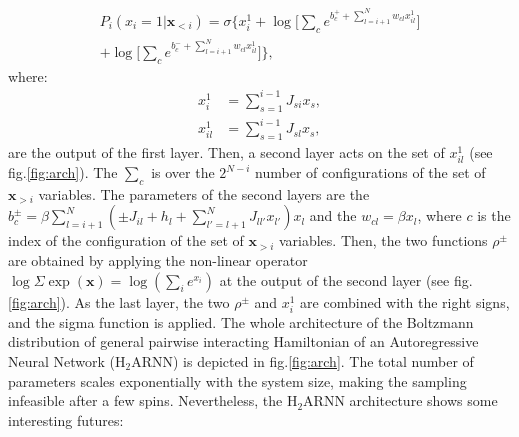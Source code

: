 \documentclass[aps,physrev,10pt,floatfix,reprint]{revtex4-2}
\begin{document}
\begin{multline}
    \label{eq:H2ANN}
        P_i\left(x_i=1 | \mathbf{x}_{<i}\right) = 
     \sigma \bigg\{ x_i^1 + \log\big[ \sum_{c} e^{b_c^+ + \sum_{l=i+1}^{N} w_{cl} x_{il}^1}\big]\\
     +\log\big[ \sum_{c} e^{b_c^- + \sum_{l=i+1}^{N} w_{cl} x_{il}^1}\big] \bigg\},
\end{multline}
where:
\begin{align}
    \label{eq:x_i_first}
    x_i^1 &= \sum_{s=1}^{i-1} J_{si} x_s,\\
    \label{eq:x_il_first}
    x_{il}^1 &= \sum_{s=1}^{i-1} J_{sl} x_s,
\end{align}
 are the output of the first layer. 
Then, a second layer acts on the set of $x_{il}^1$ (see fig.\ref{fig:arch}). The $\sum_{c}$ is over the $2^{N-i}$ number of configurations of the set of $\mathbf{x}_{>i}$ variables. 
The parameters of the second layers are the $b_c^{\pm} = \beta\sum_{l=i+1}^N (\pm J_{il} + h_l + \sum_{l'=l+1}^N J_{ll'}x_{l'}) x_l $ and the $w_{cl}=\beta x_l$, where $c$ is the index of the configuration of the set of $\mathbf{x}_{>i}$ variables. Then, the two functions $\rho^{\pm}$ are obtained by applying the non-linear operator $\log \Sigma \exp (\mathbf{x}) = \log(\sum_i e^{x_i})$ at the output of the second layer (see fig.\ref{fig:arch}). 
As the last layer, the two $\rho^{\pm}$ and $x_i^1$ are combined with the right signs, and the sigma function is applied. The whole architecture of the Boltzmann distribution of general pairwise interacting Hamiltonian of an Autoregressive Neural Network ($\text{H}_2\text{ARNN}$) is depicted in fig.\ref{fig:arch}. The total number of parameters scales exponentially with the system size, making the sampling infeasible after a few spins.
Nevertheless, the $\text{H}_2\text{ARNN}$ architecture shows some interesting futures:
\end{document}
